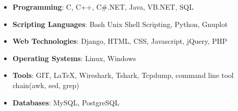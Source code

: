 \begin{itemize}
  \item \textbf{Programming}: C, C++, C\#.NET, Java, VB.NET, SQL \\[-0.6cm]
  \item \textbf{Scripting Languages}: Bash Unix Shell Scripting, Python, Gnuplot \\[-0.6cm]
  \item \textbf{Web Technologies}: Django, HTML, CSS, Javascript, jQuery, PHP \\[-0.6cm]
  \item \textbf{Operating Systems}: Linux, Windows \\[-0.6cm]
  \item \textbf{Tools}: GIT, \LaTeX, Wireshark, Tshark, Tcpdump, command line tool chain(awk, sed, grep) \\[-0.6cm]
  \item \textbf{Databases}: MySQL, PostgreSQL \\[-0.4cm]
\end{itemize}
